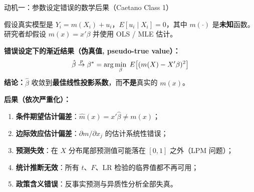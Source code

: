 \documentclass[aspectratio=169, 10pt]{beamer}
\begin{document}
\begin{frame}{动机一：参数设定错误的数学后果（Caetano Class 1）}

  假设真实模型是 $Y_i = m(X_i) + u_i$，$E[u_i\mid X_i]=0$，其中 $m(\cdot)$ 是\textbf{未知}函数。
  研究者却假设 $m(x) = x'\beta$ 并使用 OLS / MLE 估计。

  \begin{highlightbox}
    \textbf{错误设定下的渐近结果（伪真值, pseudo-true value）：}
    \[
      \hat\beta \overset{p}{\to} \beta^* = \arg\min_{\beta}\; E\bigl[(m(X) - X'\beta)^2\bigr]
    \]
    \textbf{结论：}$\hat\beta$ 收敛到\textbf{最佳线性投影系数}，而\textbf{不是}真实的 $m(x)$。
  \end{highlightbox}

  \textbf{后果（依次严重化）：}
  \begin{enumerate}
    \item \textbf{条件期望估计偏差}：$\hat m(x) = x'\hat\beta \neq m(x)$；
    \item \textbf{边际效应估计偏差}：$\partial m/\partial x_j$ 的估计系统性错误；
    \item \textbf{预测失效}：在 $X$ 分布尾部预测值可能落在 $[0,1]$ 之外（LPM 问题）；
    \item \textbf{统计推断无效}：所有 $t$、$F$、LR 检验的临界值都不再可用；
    \item \textbf{政策含义错误}：反事实预测与异质性分析全部失真。
  \end{enumerate}

\end{frame}
\end{document}
